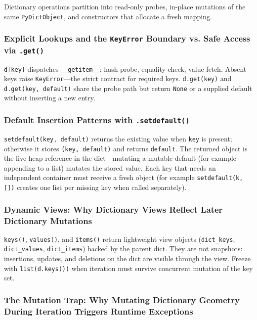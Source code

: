 \documentclass[a4paper,twoside]{report}
\begin{document}
Dictionary operations partition into read-only probes, in-place mutations of the same \texttt{PyDictObject}, and constructors that allocate a fresh mapping.

\subsubsection{Explicit Lookups and the \texttt{KeyError} Boundary vs. Safe Access via \texttt{.get()}}

\texttt{d[key]} dispatches \texttt{\_\_getitem\_\_}: hash probe, equality check, value fetch. Absent keys raise \texttt{KeyError}---the strict contract for required keys. \texttt{d.get(key)} and \texttt{d.get(key, default)} share the probe path but return \texttt{None} or a supplied default without inserting a new entry.

\subsubsection{Default Insertion Patterns with \texttt{.setdefault()}}

\texttt{setdefault(key, default)} returns the existing value when \texttt{key} is present; otherwise it stores \texttt{(key, default)} and returns \texttt{default}. The returned object is the live heap reference in the dict---mutating a mutable default (for example appending to a list) mutates the stored value. Each key that needs an independent container must receive a fresh object (for example \texttt{setdefault(k, [])} creates one list per missing key when called separately).

\subsubsection{Dynamic Views: Why Dictionary Views Reflect Later Dictionary Mutations}

\texttt{keys()}, \texttt{values()}, and \texttt{items()} return lightweight view objects (\texttt{dict\_keys}, \texttt{dict\_values}, \texttt{dict\_items}) backed by the parent dict. They are not snapshots: insertions, updates, and deletions on the dict are visible through the view. Freeze with \texttt{list(d.keys())} when iteration must survive concurrent mutation of the key set.

\subsubsection{The Mutation Trap: Why Mutating Dictionary Geometry During Iteration Triggers Runtime Exceptions}
\end{document}

